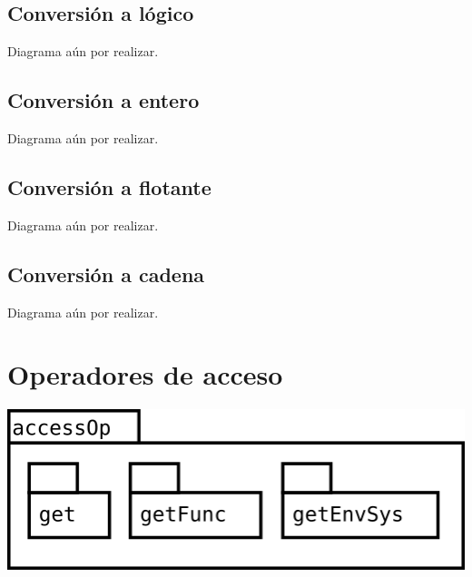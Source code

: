 \subsection {Conversión a lógico}
Diagrama aún por realizar.

\subsection {Conversión a entero}
Diagrama aún por realizar.

\subsection {Conversión a flotante}
Diagrama aún por realizar.

\subsection {Conversión a cadena}
Diagrama aún por realizar.

\pagebreak
\section {Operadores de acceso}
\begin{center}
\includegraphics[scale=0.4]{accessOp-package.png} \\
\end{center}

